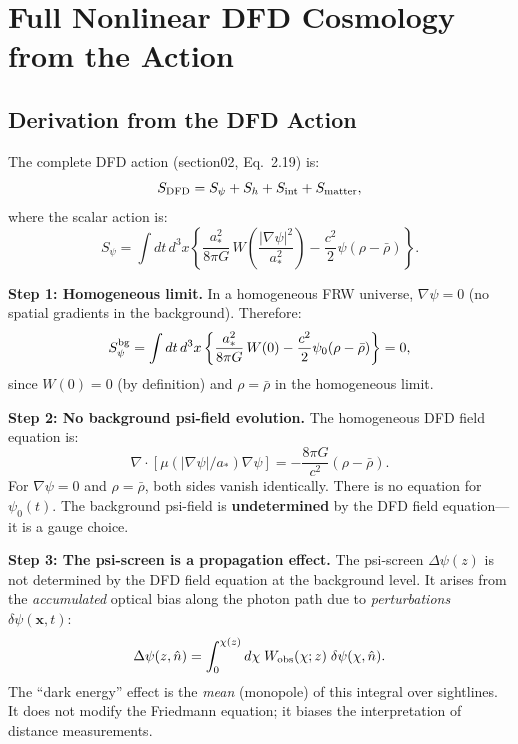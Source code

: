 \documentclass[11pt,a4paper]{article}
\newcounter{findingctr}
\newenvironment{finding}[1][]{%
  \refstepcounter{findingctr}%
  \begin{tcolorbox}[colback=blue!3!white, colframe=blue!50!black,
    title=\textbf{Finding \thefindingctr: #1}]
}{%
  \end{tcolorbox}%
}
\newcommand{\Dpsi}{\Delta\psi}
\begin{document}
\section{Full Nonlinear DFD Cosmology from the Action}
\label{sec:nonlinear}

\begin{finding}[\textbf{Nonlinear Friedmann}: DFD Has No Modified
  Background Equation]
\label{find:nonlinear}

\subsection*{Derivation from the DFD Action}

The complete DFD action (section02, Eq.~2.19) is:
\begin{equation}
S_{\rm DFD} = S_\psi + S_h + S_{\rm int} + S_{\rm matter},
\end{equation}
where the scalar action is:
\begin{equation}
S_\psi = \int dt\,d^3x \left\{
  \frac{a_*^2}{8\pi G}\,W\!\left(\frac{|\nabla\psi|^2}{a_*^2}\right)
  - \frac{c^2}{2}\psi(\rho - \bar{\rho})
\right\}.
\end{equation}

\textbf{Step 1: Homogeneous limit.}  In a homogeneous FRW universe,
$\nabla\psi = 0$ (no spatial gradients in the background).  Therefore:
\begin{equation}
S_\psi^{\rm bg} = \int dt\,d^3x \left\{
  \frac{a_*^2}{8\pi G}\,W(0) - \frac{c^2}{2}\psi_0(\rho - \bar{\rho})
\right\} = 0,
\end{equation}
since $W(0) = 0$ (by definition) and $\rho = \bar{\rho}$ in the
homogeneous limit.

\textbf{Step 2: No background psi-field evolution.}
The homogeneous DFD field equation is:
\begin{equation}
\nabla\cdot[\mu(|\nabla\psi|/a_*)\nabla\psi] = -\frac{8\pi G}{c^2}
(\rho - \bar\rho).
\end{equation}
For $\nabla\psi = 0$ and $\rho = \bar\rho$, both sides vanish
identically.  There is no equation for $\psi_0(t)$.  The background
psi-field is \textbf{undetermined} by the DFD field equation---it is
a gauge choice.

\textbf{Step 3: The psi-screen is a propagation effect.}
The psi-screen $\Dpsi(z)$ is not determined by the DFD field equation
at the background level.  It arises from the \emph{accumulated}
optical bias along the photon path due to \emph{perturbations}
$\delta\psi(\mathbf{x},t)$:
\begin{equation}
\Dpsi(z,\hat n) = \int_0^{\chi(z)} d\chi\;W_{\rm obs}(\chi;z)\;
\delta\psi(\chi,\hat n).
\end{equation}
The ``dark energy'' effect is the \emph{mean} (monopole) of this
integral over sightlines.  It does not modify the Friedmann equation;
it biases the interpretation of distance measurements.


\end{finding}
\end{document}
